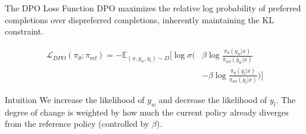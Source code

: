 \documentclass[xcolor=svgnames, 10pt, handout]{beamer}
\begin{document}
\begin{frame}{The DPO Loss Function}
    DPO maximizes the relative log probability of preferred completions over dispreferred completions, inherently maintaining the KL constraint.
    \pause

    \begin{equation*}
    \begin{split}
        \mathcal{L}_{DPO}(\pi_\theta; \pi_{\text{ref}}) = -\mathbb{E}_{(x, y_w, y_l) \sim D} \Bigg[ \log \sigma \Bigg( &\beta \log \frac{\pi_\theta(y_w|x)}{\pi_{\text{ref}}(y_w|x)} \\
        &- \beta \log \frac{\pi_\theta(y_l|x)}{\pi_{\text{ref}}(y_l|x)} \Bigg) \Bigg]
    \end{split}
    \end{equation*}
    \pause

    \begin{block}{Intuition}
    We increase the likelihood of $y_w$ and decrease the likelihood of $y_l$. The degree of change is weighted by how much the current policy already diverges from the reference policy (controlled by $\beta$).
    \end{block}
\end{frame}
\end{document}
